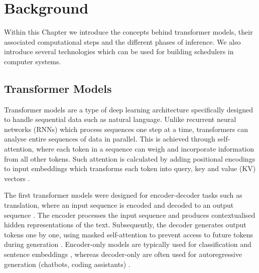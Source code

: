 \graphicspath{{chapters/02background/graphics}}

\chapter{Background}

Within this Chapter we introduce the concepts behind transformer models, their associated computational steps and the different phases of inference.
We also introduce several technologies which can be used for building schedulers in computer systems.

%

\section{Transformer Models}

Transformer models are a type of deep learning architecture specifically designed to handle sequential data such as natural language.
Unlike recurrent neural networks (RNNs) which process sequences one step at a time, transformers can analyse entire sequences of data in parallel.
This is achieved through self-attention, where each token in a sequence can weigh and incorporate information from all other tokens.
Such attention is calculated by adding positional encodings to input embeddings which transforms each token into query, key and value (KV) vectors \autocite{vaswaniAttentionAllYou2023}.


The first transformer models were designed for encoder-decoder tasks such as translation, where an input sequence is encoded and decoded to an output sequence \autocite{lewisBARTDenoisingSequencetoSequence2019}.
The encoder processes the input sequence and produces contextualised hidden representations of the text.
Subsequently, the decoder generates output tokens one by one, using masked self-attention to prevent access to future tokens during generation \autocite{vaswaniAttentionAllYou2023}.
Encoder-only models are typically used for classification and sentence embeddings \autocite{devlinBERTPretrainingDeep2019}, whereas decoder-only are often used for autoregressive generation (chatbots, coding assistants) \autocite{radfordImprovingLanguageUnderstanding}.

